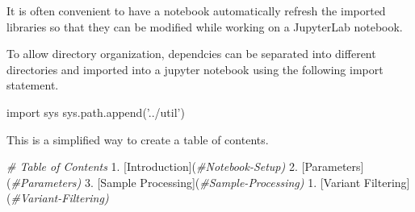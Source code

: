 \documentclass[]{book}
\newenvironment{Shaded}{\begin{snugshade}}{\end{snugshade}}
\newcommand{\DecValTok}[1]{\textcolor[rgb]{0.00,0.00,0.81}{#1}}
\newcommand{\StringTok}[1]{\textcolor[rgb]{0.31,0.60,0.02}{#1}}
\newcommand{\ImportTok}[1]{#1}
\newcommand{\CommentTok}[1]{\textcolor[rgb]{0.56,0.35,0.01}{\textit{#1}}}
\newcommand{\OperatorTok}[1]{\textcolor[rgb]{0.81,0.36,0.00}{\textbf{#1}}}
\newcommand{\NormalTok}[1]{#1}
\begin{document}
\begin{Shaded}
\end{Shaded}

It is often convenient to have a notebook automatically refresh the
imported libraries so that they can be modified while working on a
JupyterLab notebook.

\begin{Shaded}
\begin{Highlighting}[]
\OperatorTok{%}\NormalTok{reload_ext autoreload}
\OperatorTok{%}\NormalTok{autoreload }\DecValTok{2}
\end{Highlighting}
\end{Shaded}

To allow directory organization, dependcies can be separated into
different directories and imported into a jupyter notebook using the
following import statement.

\begin{Shaded}
\begin{Highlighting}[]
\ImportTok{import}\NormalTok{ sys}
\NormalTok{sys.path.append(}\StringTok{'../util'}\NormalTok{)}
\end{Highlighting}
\end{Shaded}

This is a simplified way to create a table of contents.

\begin{Shaded}
\begin{Highlighting}[]
\CommentTok{# Table of Contents}
\DecValTok{1}\NormalTok{. [Introduction](}\CommentTok{#Notebook-Setup)}
\DecValTok{2}\NormalTok{. [Parameters](}\CommentTok{#Parameters)}
\DecValTok{3}\NormalTok{. [Sample Processing](}\CommentTok{#Sample-Processing)}
    \DecValTok{1}\NormalTok{. [Variant Filtering](}\CommentTok{#Variant-Filtering)}
\end{Highlighting}
\end{Shaded}
\end{document}
